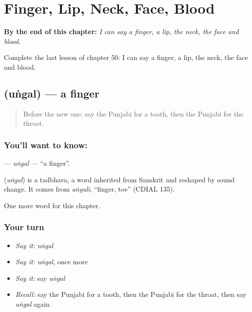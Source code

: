 
\chapter{Finger, Lip, Neck, Face, Blood}
\label{ch:pa-finger-lip-neck-face-blood}

\begin{chapteropening}
\textbf{By the end of this chapter:} \emph{I can say a finger, a lip, the neck, the face and blood.}

Complete the last lesson of chapter 50: I can say a finger, a lip, the neck, the face and blood.
\end{chapteropening}

\section[\texorpdfstring{\pa{ਉਂਗਲ} (uṅgal)}{ਉਂਗਲ (uṅgal)}]{ (uṅgal) — a finger}

\label{lesson:PA-C50-ungal}



\begin{quote}
Before the new one: say the Punjabi for a tooth, then the Punjabi for the throat.
\end{quote}

\subsection*{You'll want to know: }
\textbf{} — \emph{uṅgal} — \textquotedblleft{}a finger\textquotedblright{}.

\begin{cousinweb}
\textbf{} (\emph{uṅgal}) is a tadbhava, a word inherited from Sanskrit and reshaped by sound change. It comes from \emph{aṅguli}, \textquotedblleft{}finger, toe\textquotedblright{} (CDIAL 135).
\end{cousinweb}

\begin{grammarlens}[title={What you've built}]
One more word for this chapter.
\end{grammarlens}

\subsection*{Your turn}
\begin{itemize}
\raggedright
  \item \emph{Say it:} \emph{uṅgal}
  \item \emph{Say it:} \emph{uṅgal}, once more
  \item \emph{Say it:} say \emph{uṅgal}
  \item \emph{Recall:} say the Punjabi for a tooth, then the Punjabi for the throat, then say \emph{uṅgal} again
\end{itemize}

